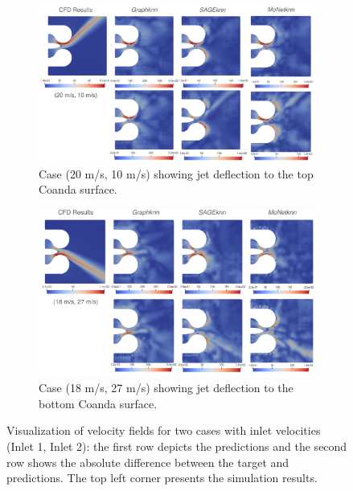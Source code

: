 \begin{figure}[ht]
    \centering
    \begin{subfigure}[b]{14cm}
        \centering
        \includegraphics[width=\textwidth]{images/Methodology/Asset 18.png}
        \caption{Case (20 m/s, 10 m/s) showing jet deflection to the top Coanda surface.}
        \label{fig:allvel1}
    \end{subfigure}
    \begin{subfigure}[b]{14cm}
        \centering
        \includegraphics[width=\textwidth]{images/Methodology/Asset 17.png}
        \caption{Case (18 m/s, 27 m/s) showing jet deflection to the bottom Coanda surface.}
        \label{fig:allvel2}
    \end{subfigure}
    \caption{Visualization of velocity fields for two cases with inlet velocities (Inlet 1, Inlet 2): the first row depicts the predictions and the second row shows the absolute difference between the target and predictions. The top left corner presents the simulation results.}
    \label{2vel1}
\end{figure}
